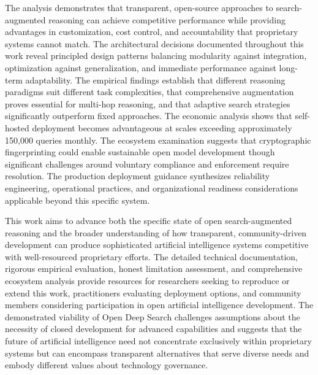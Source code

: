 The analysis demonstrates that transparent, open-source approaches to search-augmented reasoning can achieve competitive performance while providing advantages in customization, cost control, and accountability that proprietary systems cannot match. The architectural decisions documented throughout this work reveal principled design patterns balancing modularity against integration, optimization against generalization, and immediate performance against long-term adaptability. The empirical findings establish that different reasoning paradigms suit different task complexities, that comprehensive augmentation proves essential for multi-hop reasoning, and that adaptive search strategies significantly outperform fixed approaches. The economic analysis shows that self-hosted deployment becomes advantageous at scales exceeding approximately 150,000 queries monthly. The ecosystem examination suggests that cryptographic fingerprinting could enable sustainable open model development though significant challenges around voluntary compliance and enforcement require resolution. The production deployment guidance synthesizes reliability engineering, operational practices, and organizational readiness considerations applicable beyond this specific system.

This work aims to advance both the specific state of open search-augmented reasoning and the broader understanding of how transparent, community-driven development can produce sophisticated artificial intelligence systems competitive with well-resourced proprietary efforts. The detailed technical documentation, rigorous empirical evaluation, honest limitation assessment, and comprehensive ecosystem analysis provide resources for researchers seeking to reproduce or extend this work, practitioners evaluating deployment options, and community members considering participation in open artificial intelligence development. The demonstrated viability of Open Deep Search challenges assumptions about the necessity of closed development for advanced capabilities and suggests that the future of artificial intelligence need not concentrate exclusively within proprietary systems but can encompass transparent alternatives that serve diverse needs and embody different values about technology governance.
